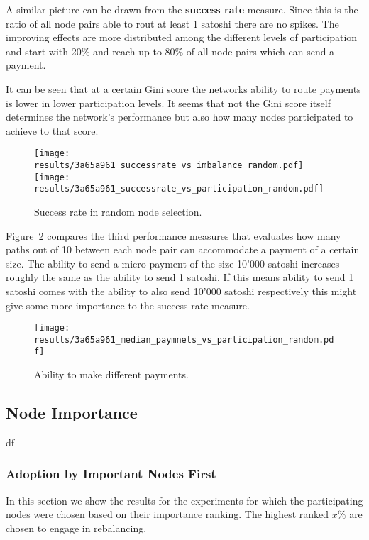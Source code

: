 \documentclass[final]{fhnwreport}       %
\begin{document}
A similar picture can be drawn from the \textbf{success rate} measure. Since this is the ratio of all node pairs able to rout at least 1 satoshi there are no spikes. The improving effects are more distributed among the different levels of participation and start with 20\% and reach up to 80\% of all node pairs which can send a payment.

It can be seen that at a certain Gini score the networks ability to route payments is lower in lower participation levels. It seems that not the Gini score itself determines the network's performance but also how many nodes participated to achieve to that score.

\begin{figure}[htp]
\centering
\texttt{[image: results/3a65a961\_successrate\_vs\_imbalance\_random.pdf]}\hfill
\texttt{[image: results/3a65a961\_successrate\_vs\_participation\_random.pdf]}
\caption{Success rate in random node selection.}
\label{fig:success_random}
\end{figure}


Figure~\ref{fig:sizes_random} compares the third performance measures that evaluates how many paths out of 10 between each node pair can accommodate a payment of a certain size. The ability to send a micro payment of the size 10'000 satoshi increases roughly the same as the ability to send 1 satoshi. If this means ability to send 1 satoshi comes with the ability to also send 10'000 satoshi respectively this might give some more importance to the success rate measure.

\begin{figure}[htp]
\centering
\texttt{[image: results/3a65a961\_median\_paymnets\_vs\_participation\_random.pdf]}
\caption{Ability to make different payments.}
\label{fig:sizes_random}
\end{figure}

\subsection{Node Importance}
df
\subsubsection{Adoption by Important Nodes First}\label{subsub:desc}
In this section we show the results for the experiments for which the participating nodes were chosen based on their importance ranking. The highest ranked $x\%$ are chosen to engage in rebalancing. 
\end{document}

